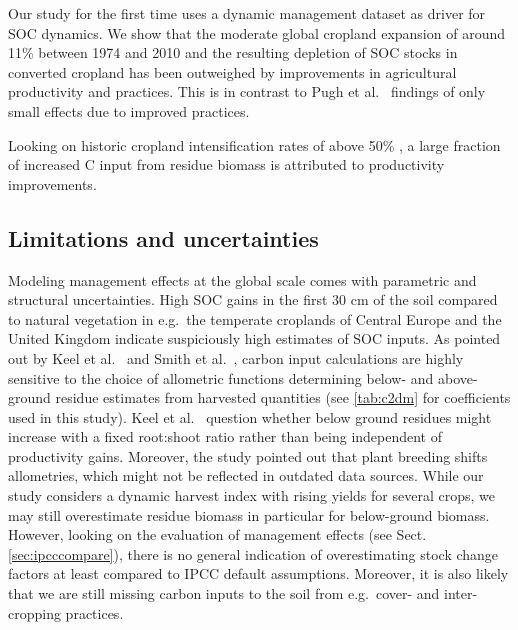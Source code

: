 \documentclass[gc, manuscript]{copernicus}
\begin{document}
Our study for the first time uses a dynamic management dataset as driver for SOC dynamics. We show that the moderate global cropland expansion of around 11\% between 1974 and 2010 and the resulting depletion of SOC stocks in converted cropland has been outweighed by improvements in agricultural productivity and practices. This is in contrast to Pugh et al.~\citeyearpar{pugh_simulated_2015} findings of only small effects due to improved practices.

Looking on historic cropland intensification rates of above 50\% \citep{rudel_agricultural_2009}, a large fraction of increased C input from residue biomass is attributed to productivity improvements.

\hypertarget{limitations-and-uncertainties}{%
\subsection{Limitations and uncertainties}\label{limitations-and-uncertainties}}

Modeling management effects at the global scale comes with parametric and structural uncertainties. High SOC gains in the first 30 cm of the soil compared to natural vegetation in e.g.~the temperate croplands of Central Europe and the United Kingdom indicate suspiciously high estimates of SOC inputs. As pointed out by Keel et al.~\citeyearpar{keel_large_2017} and Smith et al.~\citeyearpar{smith_how_2020}, carbon input calculations are highly sensitive to the choice of allometric functions determining below- and above-ground residue estimates from harvested quantities (see \ref{tab:c2dm} for coefficients used in this study). Keel et al.~\citeyearpar{keel_large_2017} question whether below ground residues might increase with a fixed root:shoot ratio rather than being independent of productivity gains. Moreover, the study pointed out that plant breeding shifts allometries, which might not be reflected in outdated data sources. While our study considers a dynamic harvest index with rising yields for several crops, we may still overestimate residue biomass in particular for below-ground biomass. However, looking on the evaluation of management effects (see Sect. \ref{sec:ipcccompare}), there is no general indication of overestimating stock change factors at least compared to IPCC default assumptions. Moreover, it is also likely that we are still missing carbon inputs to the soil from e.g.~cover- and inter-cropping practices.
\end{document}
